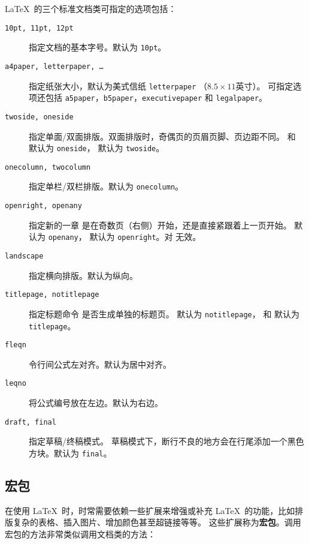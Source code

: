 \LaTeX\ 的三个标准文档类可指定的选项包括：
\begin{description}
\item[\texttt{10pt, 11pt, 12pt}] \quad 指定文档的基本字号。默认为 \texttt{10pt}。
\item[\texttt{a4paper, letterpaper, \ldots}] \quad 指定纸张大小，默认为美式信纸 \texttt{letterpaper} （$8.5\times11$英寸）。
可指定选项还包括 \texttt{a5paper}，\texttt{b5paper}，\texttt{executivepaper} 和 \texttt{legalpaper}。
\item[\texttt{twoside, oneside}] \quad 指定单面/双面排版。双面排版时，奇偶页的页眉页脚、页边距不同。
 和  默认为 \texttt{oneside}， 默认为 \texttt{twoside}。
\item[\texttt{onecolumn, twocolumn}] \quad 指定单栏/双栏排版。默认为 \texttt{onecolumn}。
\item[\texttt{openright, openany}] \quad 指定新的一章  是在奇数页（右侧）开始，还是直接紧跟着上一页开始。
 默认为 \texttt{openany}， 默认为 \texttt{openright}。对  无效。
\item[\texttt{landscape}] \quad 指定横向排版。默认为纵向。
\item[\texttt{titlepage, notitlepage}] 指定标题命令  是否生成单独的标题页。
 默认为 \texttt{notitlepage}， 和  默认为 \texttt{titlepage}。
\item[\texttt{fleqn}] \quad 令行间公式左对齐。默认为居中对齐。
\item[\texttt{leqno}] \quad 将公式编号放在左边。默认为右边。
\item[\texttt{draft, final}] \quad 指定草稿/终稿模式。
草稿模式下，断行不良的地方会在行尾添加一个黑色方块。默认为 \texttt{final}。
\end{description}

\subsection{宏包}\label{subsec:packages}

在使用 \LaTeX\ 时，时常需要依赖一些扩展来增强或补充 \LaTeX\ 的功能，比如排版复杂的表格、插入图片、增加颜色甚至超链接等等。
这些扩展称为\textbf{宏包}。调用宏包的方法非常类似调用文档类的方法：
\begin{command}
\end{command}

